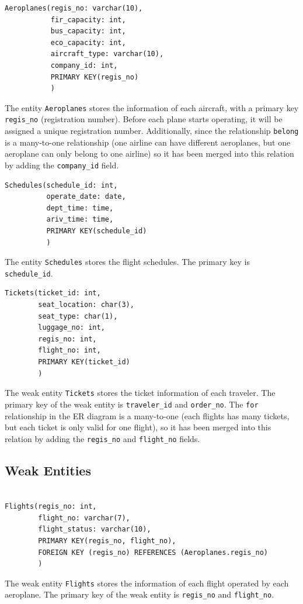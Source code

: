 \documentclass{article}
\begin{document}
	\begin{lstlisting}[keepspaces=true]               
Aeroplanes(regis_no: varchar(10),
           fir_capacity: int,
           bus_capacity: int, 
           eco_capacity: int,
           aircraft_type: varchar(10),
           company_id: int,
           PRIMARY KEY(regis_no)
           )
	\end{lstlisting}    
	The entity \texttt{Aeroplanes} stores the information of each aircraft, with a primary key \texttt{regis\_no} (registration number). Before each plane starts operating, it will be assigned a unique registration number. Additionally, since the relationship \texttt{belong} is a many-to-one relationship (one airline can have different aeroplanes, but one aeroplane can only belong to one airline) so it has been merged into this relation by adding the \texttt{company\_id} field. 
	
	\begin{lstlisting}[keepspaces=true] 
Schedules(schedule_id: int, 
          operate_date: date,
          dept_time: time,
          ariv_time: time,
          PRIMARY KEY(schedule_id)
          )
	\end{lstlisting}
	The entity \texttt{Schedules} stores the flight schedules. The primary key is \texttt{schedule\_id}.
	
	\begin{lstlisting}[keepspaces=true]
Tickets(ticket_id: int, 
        seat_location: char(3),
        seat_type: char(1),
        luggage_no: int,
        regis_no: int,
        flight_no: int,
        PRIMARY KEY(ticket_id)
        )
	\end{lstlisting}    
	The weak entity \texttt{Tickets} stores the ticket information of each traveler. The primary key of the weak entity is \texttt{traveler\_id} and \texttt{order\_no}. The \texttt{for} relationship in the ER diagram is a many-to-one (each flights has many tickets, but each ticket is only valid for one flight), so it has been merged into this relation by adding the \texttt{regis\_no} and \texttt{flight\_no} fields. 
	
	\subsection{Weak Entities}
	\begin{lstlisting}[keepspaces=true]        
		
Flights(regis_no: int, 
        flight_no: varchar(7),
        flight_status: varchar(10),
        PRIMARY KEY(regis_no, flight_no),
        FOREIGN KEY (regis_no) REFERENCES (Aeroplanes.regis_no)
        )
	\end{lstlisting}
	The weak entity \texttt{Flights} stores the information of each flight operated by each aeroplane. The primary key of the weak entity is \texttt{regis\_no} and \texttt{flight\_no}.
\end{document}

